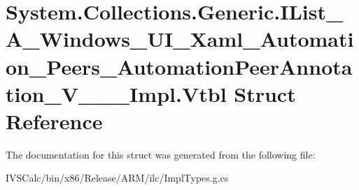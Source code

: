\hypertarget{struct_system_1_1_collections_1_1_generic_1_1_i_list___a___windows___u_i___xaml___automation___p7e70238b262e4ec61fdbd7213d9006ee}{}\section{System.\+Collections.\+Generic.\+I\+List\+\_\+\+A\+\_\+\+Windows\+\_\+\+U\+I\+\_\+\+Xaml\+\_\+\+Automation\+\_\+\+Peers\+\_\+\+Automation\+Peer\+Annotation\+\_\+\+V\+\_\+\+\_\+\+\_\+\+Impl.\+Vtbl Struct Reference}
\label{struct_system_1_1_collections_1_1_generic_1_1_i_list___a___windows___u_i___xaml___automation___p7e70238b262e4ec61fdbd7213d9006ee}


The documentation for this struct was generated from the following file\+:\begin{DoxyCompactItemize}
\item 
I\+V\+S\+Calc/bin/x86/\+Release/\+A\+R\+M/ilc/Impl\+Types.\+g.\+cs\end{DoxyCompactItemize}
